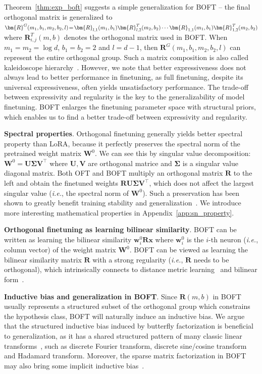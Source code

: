 Theorem~\ref{thm:exp_boft} suggests a simple generalization for BOFT -- the final orthogonal matrix is generalized to $\thickmuskip=2mu \medmuskip=2mu \bm{R}^G(m_1,b_1,m_2,b_2,l)=\bm{R}_{l,1}(m_1,b_1)\bm{R}_{l,2}^T(m_2,b_2)\cdots\bm{R}_{1,1}(m_1,b_1)\bm{R}_{1,2}^T(m_2,b_2)$ where $\bm{R}_{i,j}^T(m,b)$ denotes the orthogonal matrix used in BOFT. When $m_1=m_2=\log d$, $b_1=b_2=2$ and $l=d-1$, then $\bm{R}^G(m_1,b_1,m_2,b_2,l)$ can represent the entire orthogonal group. Such a matrix composition is also called kaleidoscope hierarchy~\cite{dao2019kaleidoscope}. However, we note that better expressiveness does not always lead to better performance in finetuning, as full finetuning, despite its universal expressiveness, often yields unsatisfactory performance. The trade-off between expressivity and regularity is the key to the generalizability of model finetuning. BOFT enlarges the finetuning parameter space with structural priors, which enables us to find a better trade-off between expressivity and regularity.

\textbf{Spectral properties}. Orthogonal finetuning generally yields better spectral property than LoRA, because it perfectly preserves the spectral norm of the pretrained weight matrix $\bm{W}^0$. We can see this by singular value decomposition: $\bm{W}^0=\bm{U}\bm{\Sigma}\bm{V}^\top$ where $\bm{U},\bm{V}$ are orthogonal matrice and $\bm{\Sigma}$ is a singular value diagonal matrix. Both OFT and BOFT multiply an orthogonal matrix $\bm{R}$ to the left and obtain the finetuned weights $\bm{R}\bm{U}\bm{\Sigma}\bm{V}^\top$, which does not affect the largest singular value (\emph{i.e.}, the spectral norm of $\bm{W}^0$). Such a preservation has been shown to greatly benefit training stability and generalization~\cite{miyato2018spectral,yoshida2017spectral}. We introduce more interesting mathematical properties in Appendix~\ref{app:sn_property}.

\textbf{Orthogonal finetuning as learning bilinear similarity}. BOFT can be written as learning the bilinear similarity $\bm{w}^0_i\bm{R}\bm{x}$ where $\bm{w}^0_i$ is the $i$-th neuron (\emph{i.e.}, column vector) of the weight matrix $\bm{W}^0$. BOFT can be viewed as learning the bilinear similarity matrix $\bm{R}$ with a strong regularity (\emph{i.e.}, $\bm{R}$ needs to be orthogonal), which intrinsically connects to distance metric learning~\cite{xing2002distance} and bilinear form~\cite{roman2005advanced}.

\textbf{Inductive bias and generalization in BOFT}. Since $\bm{R}(m,b)$ in BOFT usually represents a structured subset of the orthogonal group which constrains the hypothesis class, BOFT will naturally induce an inductive bias. We argue that the structured inductive bias induced by butterfly factorization is beneficial to generalization, as it has a shared structured pattern of many classic linear transforms~\cite{dao2019kaleidoscope}, such as discrete Fourier transform, discrete sine/cosine transform and Hadamard transform. Moreover, the sparse matrix factorization in BOFT may also bring some implicit inductive bias~\cite{gunasekar2017implicit,li2018algorithmic,liu2019neural}.

